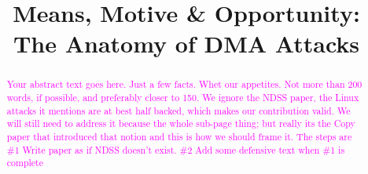 \usepackage{filecontents}

\providecommand{\data}{\textit{data }}
\providecommand{\shinfo}{\texttt{skb\_shared\_info }}
\providecommand{\skb}{\texttt{sk\_buff }}
\providecommand{\page}{\texttt{struct page }}
\providecommand{\uarg}{\texttt{ubuf\_info }}
\providecommand{\kva}{KVA }
\providecommand{\iova}{IOVA }
\providecommand{\mabaf}{malicious buffer }
\providecommand{\spb}{SPB\-2 }
\providecommand{\oportunity}{\textit{Opportunity} }
\providecommand{\means}{\textit{Means} }
\providecommand{\motivation}{\textit{Motivation} }

\newcommand{\SV}[1]{{\textcolor{red}{[Shay:#1}]}} 



\date{}

\title{\Large \bf Means, Motive \& Opportunity: The Anatomy of DMA Attacks}

\begin{comment}
\author{
{\rm Markuze Alex}\\
Technion, VMware Research
\and
{\rm Gil Kupfer}\\
Technion
\and
{\rm Nadav Amit}\\
VMware Research
\and{\rm Dan Tsafrir}\\
Technion, VMware Research
} %
\end{comment}

\maketitle

\begin{abstract}
\textcolor{magenta}{Your abstract text goes here. Just a few facts. Whet our appetites.
Not more than 200 words, if possible, and preferably closer to 150.\newline
We ignore the NDSS paper, the Linux attacks it mentions are at best half backed, which makes our contribution valid. We will still need to address it because the whole sub-page thing; but really its the Copy paper that introduced that notion and this is how we should frame it. The steps are \#1 Write paper as if NDSS doesn't exist. \#2 Add some defensive text when \#1 is complete}
\end{abstract}


